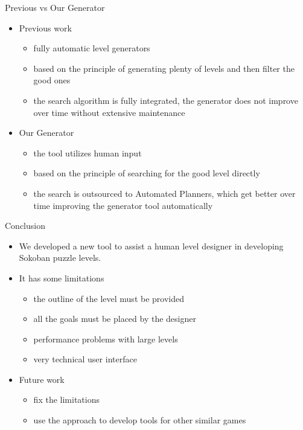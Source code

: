 \documentclass[12pt, aspectratio=169]{beamer} %
\begin{document}
\begin{frame}{Previous vs Our Generator}
\begin{itemize}
\item Previous work
\begin{itemize}
\item fully automatic level generators
\item based on the principle of generating plenty of levels and then filter the good ones
\item the search algorithm is fully integrated, the generator does not improve over time without extensive maintenance
\end{itemize}
\item Our Generator
\begin{itemize}
\item the tool utilizes human input
\item based on the principle of searching for the good level directly
\item the search is outsourced to Automated Planners, which get better over time improving the generator tool automatically
\end{itemize}
\end{itemize}
\end{frame}

\begin{frame}{Conclusion}
\begin{itemize}
\item We developed a new tool to assist a human level designer in developing Sokoban puzzle levels. 
\item It has some limitations
\begin{itemize}
\item the outline of the level must be provided
\item all the goals must be placed by the designer
\item performance problems with large levels
\item very technical user interface
\end{itemize}
\item Future work
\begin{itemize}
\item fix the limitations
\item use the approach to develop tools for other similar games
\end{itemize}

\end{itemize}
\end{frame}
\end{document}
